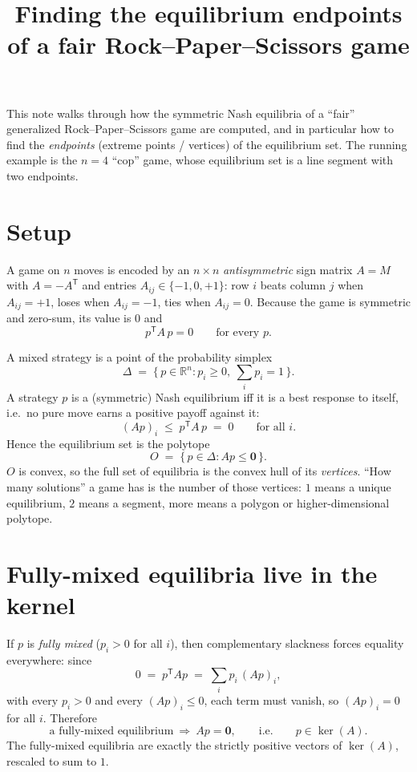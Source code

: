 \documentclass[11pt]{article}
\title{Finding the equilibrium endpoints of a fair Rock--Paper--Scissors game}
\author{}
\date{}
\newcommand{\R}{\mathbb{R}}
\newcommand{\simplex}{\Delta}
\newcommand{\zero}{\mathbf{0}}
\theoremstyle{plain}
\theoremstyle{definition}
\begin{document}
\maketitle

\noindent
This note walks through how the symmetric Nash equilibria of a ``fair'' generalized
Rock--Paper--Scissors game are computed, and in particular how to find the
\emph{endpoints} (extreme points / vertices) of the equilibrium set. The running
example is the $n=4$ ``cop'' game, whose equilibrium set is a line segment with two
endpoints.

\section{Setup}

A game on $n$ moves is encoded by an $n\times n$ \emph{antisymmetric} sign matrix
$A=M$ with $A=-A^{\mathsf T}$ and entries $A_{ij}\in\{-1,0,+1\}$: row $i$ beats
column $j$ when $A_{ij}=+1$, loses when $A_{ij}=-1$, ties when $A_{ij}=0$. Because
the game is symmetric and zero-sum, its value is $0$ and
\[
  p^{\mathsf T} A\, p = 0 \qquad \text{for every } p .
\]

A mixed strategy is a point of the probability simplex
\[
  \simplex \;=\; \bigl\{\, p\in\R^n : p_i\ge 0,\ \textstyle\sum_i p_i = 1 \,\bigr\}.
\]
A strategy $p$ is a (symmetric) Nash equilibrium iff it is a best response to
itself, i.e.\ no pure move earns a positive payoff against it:
\[
  (A p)_i \;\le\; p^{\mathsf T} A\, p \;=\; 0 \qquad\text{for all } i .
\]
Hence the equilibrium set is the polytope
\begin{equation}\label{eq:O}
  O \;=\; \bigl\{\, p\in\simplex : A p \le \zero \,\bigr\}.
\end{equation}
$O$ is convex, so the full set of equilibria is the convex hull of its
\emph{vertices}. ``How many solutions'' a game has is the number of those vertices:
$1$ means a unique equilibrium, $2$ means a segment, more means a polygon or
higher-dimensional polytope.

\section{Fully-mixed equilibria live in the kernel}

If $p$ is \emph{fully mixed} ($p_i>0$ for all $i$), then complementary slackness
forces equality everywhere: since
\[
  0 \;=\; p^{\mathsf T} A p \;=\; \sum_i p_i\,(Ap)_i,
\]
with every $p_i>0$ and every $(Ap)_i\le 0$, each term must vanish, so $(Ap)_i=0$ for
all $i$. Therefore
\[
  \text{a fully-mixed equilibrium}\ \Longrightarrow\ A p = \zero,
  \qquad\text{i.e.}\qquad p\in\ker(A).
\]
The fully-mixed equilibria are exactly the strictly positive vectors of $\ker(A)$,
rescaled to sum to $1$.
\end{document}
